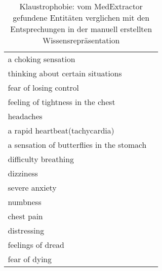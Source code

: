 \begin{table}[H]
\begin{center}
\begin{tabular}{ll}
                         a choking sensation &               \\
           thinking about certain situations &               \\
                      fear of losing control &               \\
           feeling of tightness in the chest &               \\
                                   headaches &               \\
              a rapid heartbeat(tachycardia) &               \\
   a sensation of butterflies in the stomach &               \\
                        difficulty breathing &               \\
                                   dizziness &               \\
                              severe anxiety &               \\
                                    numbness &               \\
                                  chest pain &               \\
                                 distressing &               \\
                           feelings of dread &               \\
                               fear of dying &               \\
\bottomrule
\end{tabular}
\caption{Klaustrophobie: vom MedExtractor gefundene Entitäten verglichen mit den Entsprechungen in der manuell erstellten Wissensrepräsentation}
\label{tab:claustrophobia_medextractor_manuell}
\end{center}
\end{table}

